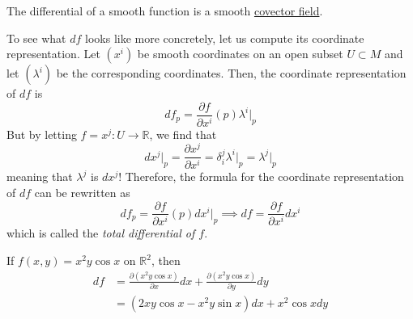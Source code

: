 \documentclass{article}
\newcounter{example}[section]
\begin{document}
    \begin{lemma}
      \label{thm:the-differential-of-a-smooth-function-is-smooth}
    The differential of a smooth function is a smooth \hyperref[def:covector-field]{covector field}. 
    \end{lemma}

    To see what $df$ looks like more concretely, let us compute its coordinate representation. Let $(x^i)$ be smooth coordinates on an open subset $U \subset M$ and let $(\lambda^i)$ be the corresponding coordinates. Then, the coordinate representation of $df$ is
    \begin{equation}
      df_p = \frac{\partial f}{\partial x^i} (p) \lambda^i \big|_p
    \end{equation}
    But by letting $f = x^j: U \to \mathbb{R}$, we find that
    \begin{equation}
      d x^j \big|_p = \frac{\partial x^j}{\partial x^i} = \delta_i^j \lambda^i \big|_p = \lambda^j \big|_p
    \end{equation}
    meaning that $\lambda^j$ is $dx^j$! Therefore, the formula for the coordinate representation of $df$ can be rewritten as
    \begin{equation}
      df_p = \frac{\partial f}{\partial x^i} (p) dx^i \big|_p \implies df = \frac{\partial f}{\partial x^i} dx^i
    \end{equation}
    which is called the \textit{total differential of $f$}. 

    \begin{example}
      \label{ex:computing-a-differential-on-r2}
    If $f(x, y) = x^2 y \cos{x}$ on $\mathbb{R}^2$, then 
    \begin{align*}
    df & = \frac{\partial( x^2 y \cos{x})}{\partial x} dx + \frac{\partial (x^2 y \cos{x})}{\partial y} dy \\
    & = (2xy \cos{x} - x^2 y \sin{x}) dx + x^2 \cos{x} dy
    \end{align*}
    \end{example}
\end{document}
